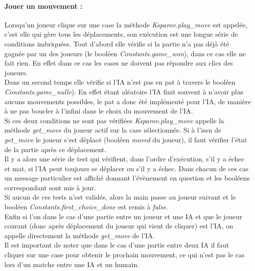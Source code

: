 \documentclass[a4paper]{article}
\begin{document}
\paragraph{Jouer un mouvement :}Lorsqu'un joueur clique sur une case la méthode \textit{Ksparov.play\_move} est appelée, c'est elle qui gère tous les déplacements, son exécution est une longue série de conditions imbriquées. Tout d'abord elle vérifie si la partie n'a pas déjà été gagnée par un des joueurs (le booléen \textit{Constants.game\_won}), dans ce cas elle ne fait rien. En effet dans ce cas les cases ne doivent pas répondre aux clics des joueurs. \\

Dans un second temps elle vérifie si l'IA n'est pas en pat à travers le booléen \textit{Constants.game\_nulle}). En effet étant aléatoire l'IA finit souvent à n'avoir plus aucuns mouvements possibles, le pat a donc été implémenté pour l'IA, de manière à ne pas boucler à l'infini dans le choix du mouvement de l'IA. \\

Si ces deux conditions ne sont pas vérifiées \textit{Ksparov.play\_move} appelle la méthode \textit{get\_move} du joueur actif sur la case sélectionnée. Si à l'issu de \textit{get\_move} le joueur s'est déplacé (booléen \textit{moved} du joueur), il faut vérifier l'état de la partie après ce déplacement. \\ 

Il y a alors une série de test qui vérifient, dans l'ordre d'exécution, s'il y a échec et mat, si l'IA peut toujours se déplacer ou s'il y a échec. Dans chacun de ces cas un message particulier est affiché donnant l'évènement en question et les booléens correspondant sont mis à jour. \\ 

Si aucun de ces tests n'est validés, alors la main passe au joueur suivant et le booléen \textit{Constants.first\_choice\_done} est remis à \textit{false}.\\

Enfin si l'on dans le cas d'une partie entre un joueur et une IA et que le joueur courant (donc après déplacement du joueur qui vient de cliquer) est l'IA, on appelle directement la méthode \textit{get\_move} de l'IA. \\ 

Il est important de noter que dans le cas d'une partie entre deux IA il faut cliquer sur une case pour obtenir le prochain mouvement, ce qui n'est pas le cas lors d'un matche entre une IA et un humain. 
\end{document}
